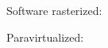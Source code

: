 
\begin{landscape}
\begin{frame}
\frametitle{}
\begin{center}

Software rasterized:

\vspace{1cm}

Paravirtualized:

\end{center}
\end{frame}
\end{landscape}
